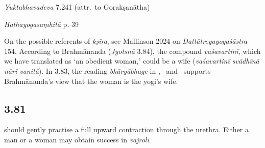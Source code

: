 \begin{ekdosis}
\begin{testimonia}[hp03_080]
\emph{Yuktabhavadeva} 7.241 (attr.~to Gorakṣanātha)
\begin{versinnote}
\end{versinnote}

\emph{Haṭhayogasaṃhitā} p. 39
\begin{versinnote}
\end{versinnote}

\end{testimonia}

\begin{philcomm}[hp03_080]
On the possible referents of \emph{kṣīra}, see Mallinson 2024 on \emph{Dattātreyayogaśāstra} 154. According to Brahmānanda (\emph{Jyotsnā} 3.84), the compound \emph{vaśavartinī}, which we have translated as `an obedient woman,' could be a wife (\emph{vaśavartinī svādhīnā nārī vanitā}). In 3.83, the reading \emph{bhāryābhage} in \etaOne, \etaTwo\ and \betaOmega\ supports Brahmānanda's view that the woman is the yogi's wife. 
\end{philcomm}


\subsection*{3.81}
\begin{translation} should gently practise a full upward contraction through the urethra. Either a man or a woman may obtain success in \emph{vajrolī}.
\end{translation}


\end{ekdosis}
